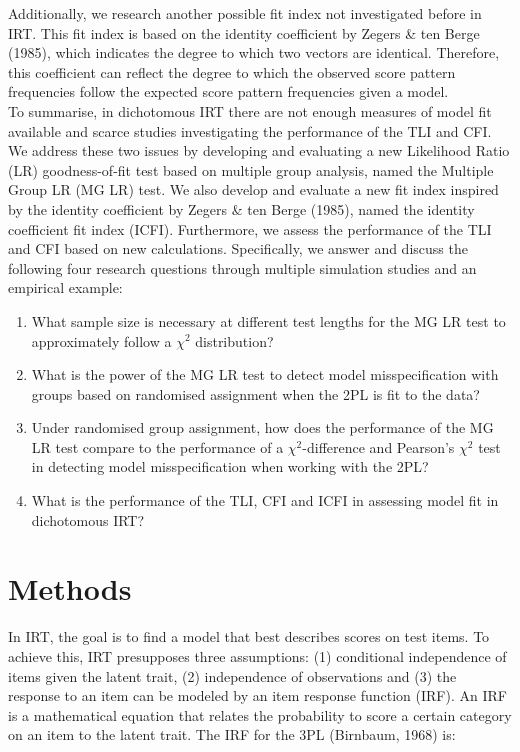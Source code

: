 \documentclass[Royal,sageapa,times,doublespace]{sagej}
\begin{document}
\indent Additionally, we research another possible fit index not investigated before in IRT. This fit index is based on the identity coefficient by Zegers \& ten Berge (1985), which indicates the degree to which two vectors are identical. Therefore, this coefficient can reflect the degree to which the observed score pattern frequencies follow the expected score pattern frequencies given a model. \\
\indent To summarise, in dichotomous IRT there are not enough measures of model fit available and scarce studies investigating the performance of the TLI and CFI. We address these two issues by developing and evaluating a new Likelihood Ratio (LR) goodness-of-fit test based on multiple group analysis, named the Multiple Group LR (MG LR) test. We also develop and evaluate a new fit index inspired by the identity coefficient by Zegers \& ten Berge (1985), named the identity coefficient fit index (ICFI). Furthermore, we assess the performance of the TLI and CFI based on new calculations. Specifically, we answer and discuss the following four research questions through multiple simulation studies and an empirical example:
\begin{enumerate}
\item{What sample size is necessary at different test lengths for the MG LR test to approximately follow a $\chi^2$ distribution?}
\item{What is the power of the MG LR test to detect model misspecification with groups based on randomised assignment when the 2PL is fit to the data?}
\item{Under randomised group assignment, how does the performance of the MG LR test compare to the performance of a $\chi^2$-difference and Pearson's $\chi^2$ test in detecting model misspecification when working with the 2PL?}
\item{What is the performance of the TLI, CFI and ICFI in assessing model fit in dichotomous IRT?}
\end{enumerate}
\vspace{1\baselineskip}
\section{\centering Methods}
In IRT, the goal is to find a model that best describes scores on test items. To achieve this, IRT presupposes three assumptions: (1) conditional independence of items given the latent trait, (2) independence of observations and (3) the response to an item can be modeled by an item response function (IRF). An IRF is a mathematical equation that relates the probability to score a certain category on an item to the latent trait. The IRF for the 3PL (Birnbaum, 1968) is:
\end{document}
